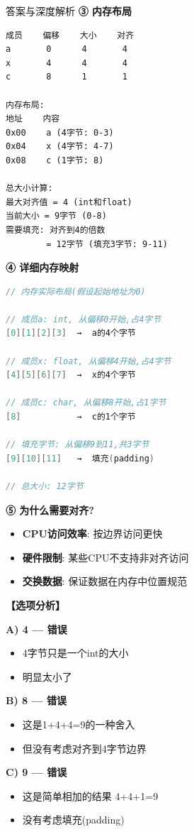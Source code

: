 \documentclass[a4paper,12pt]{article}
\begin{document}
\begin{enumerate}
\begin{bluebox}{答案与深度解析}
	\textbf{③ 内存布局}
	\begin{verbatim}
成员    偏移    大小    对齐
a       0      4       4
x       4      4       4
c       8      1       1

内存布局:
地址    内容
0x00    a (4字节: 0-3)
0x04    x (4字节: 4-7)
0x08    c (1字节: 8)

总大小计算:
最大对齐值 = 4 (int和float)
当前大小 = 9字节 (0-8)
需要填充: 对齐到4的倍数
        = 12字节 (填充3字节: 9-11)
    \end{verbatim}

	\textbf{④ 详细内存映射}
	\begin{lstlisting}[language=C]
// 内存实际布局(假设起始地址为0)

// 成员a: int, 从偏移0开始,占4字节
[0][1][2][3]  →  a的4个字节

// 成员x: float, 从偏移4开始,占4字节
[4][5][6][7]  →  x的4个字节

// 成员c: char, 从偏移8开始,占1字节
[8]           →  c的1个字节

// 填充字节: 从偏移9到11,共3字节
[9][10][11]   →  填充(padding)

// 总大小: 12字节
    \end{lstlisting}

	\textbf{⑤ 为什么需要对齐?}
	\begin{itemize}[leftmargin=*, nosep]
		\item \textbf{CPU访问效率}: 按边界访问更快
		\item \textbf{硬件限制}: 某些CPU不支持非对齐访问
		\item \textbf{交换数据}: 保证数据在内存中位置规范
	\end{itemize}

	\textbf{【选项分析】}

	\textbf{A) 4 — 错误}
	\begin{itemize}[leftmargin=*, nosep]
		\item 4字节只是一个int的大小
		\item 明显太小了
	\end{itemize}

	\textbf{B) 8 — 错误}
	\begin{itemize}[leftmargin=*, nosep]
		\item 这是1+4+4=9的一种舍入
		\item 但没有考虑对齐到4字节边界
	\end{itemize}

	\textbf{C) 9 — 错误}
	\begin{itemize}[leftmargin=*, nosep]
		\item 这是简单相加的结果 4+4+1=9
		\item 没有考虑填充(padding)
	\end{itemize}


\end{bluebox}
\end{enumerate}
\end{document}
